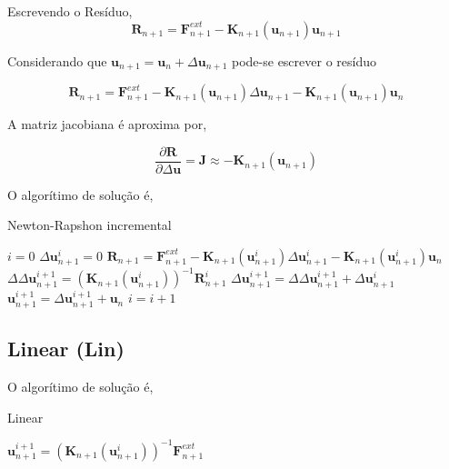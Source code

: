 \documentclass[12pt,a4paper]{article}
\begin{document}
\noindent 
Escrevendo o Resíduo,
\begin{equation}
\mathbf{R}_{n+1} = \mathbf{F}^{ext}_{n+1} - \mathbf{K}_{n+1}(\mathbf{u}_{n+1}) \mathbf{u}_{n+1} 
\end{equation}

\noindent
Considerando que $\mathbf{u}_{n+1} = \mathbf{u}_{n} + \Delta \mathbf{u}_{n+1}$ pode-se escrever o resíduo

\begin{equation}
\mathbf{R}_{n+1} = \mathbf{F}^{ext}_{n+1} - \mathbf{K}_{n+1}(\mathbf{u}_{n+1}) \Delta \mathbf{u}_{n+1} - \mathbf{K}_{n+1}(\mathbf{u}_{n+1}) \mathbf{u}_{n} 
\end{equation}

\noindent 
A matriz jacobiana é aproxima por,

\begin{equation}
\frac{\partial \mathbf{R}}{\partial \Delta \mathbf{u}} = \mathbf{J} \approx - \mathbf{K}_{n+1}(\mathbf{u}_{n+1}) 
\end{equation}

\noindent
O algorítimo de solução é,

\begin{algorithm}[H]
\caption{Newton-Rapshon incremental}
\begin{algorithmic}
	\STATE $i = 0$
	\STATE $\Delta \mathbf{u}^{i}_{n+1} = 0$
	\STATE $\mathbf{R}_{n+1} = \mathbf{F}^{ext}_{n+1} - \mathbf{K}_{n+1}(\mathbf{u}^i_{n+1}) \Delta \mathbf{u}^i_{n+1} - \mathbf{K}_{n+1}(\mathbf{u}^i_{n+1}) \mathbf{u}_{n} $ 
	\STATE $\Delta \Delta \mathbf{u}^{i+1}_{n+1} = \left(\mathbf{K}_{n+1}(\mathbf{u}^i_{n+1})\right)^{-1} \mathbf{R}^i_{n+1}$ 
	\STATE $\Delta \mathbf{u}^{i+1}_{n+1} = \Delta \Delta \mathbf{u}^{i+1}_{n+1} + \Delta \mathbf{u}^{i}_{n+1}$
	\STATE $\mathbf{u}^{i+1}_{n+1} = \Delta \mathbf{u}^{i+1}_{n+1} + \mathbf{u}_{n}$
	\STATE $i = i+1$
	\ENDWHILE		
\end{algorithmic}
\end{algorithm}

\subsection{Linear (Lin)}

O algorítimo de solução é,

\begin{algorithm}[H]
\caption{Linear}
\begin{algorithmic}
	\STATE $\mathbf{u}^{i+1}_{n+1} = \left(\mathbf{K}_{n+1}(\mathbf{u}^i_{n+1})\right)^{-1} \mathbf{F}^{ext}_{n+1} $		
\end{algorithmic}
\end{algorithm}
 
\end{document}
